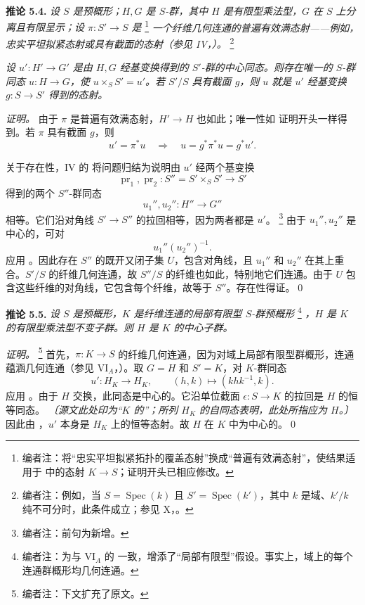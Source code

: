 \medskip
\noindent{}\textbf{推论 5.4.}
\textit{设 \(S\) 是预概形；\(H,G\) 是 \(S\)-群，其中 \(H\) 是有限型乘法型，\(G\) 在 \(S\) 上分离且有限呈示；设 \(\pi:S'\to S\) 是}%
\footnote{编者注：将“忠实平坦拟紧拓扑的覆盖态射”换成“普遍有效满态射”，使结果适用于  中的态射 \(K\to S\)；证明开头已相应修改。}
\textit{一个纤维几何连通的普遍有效满态射——例如，忠实平坦拟紧态射或具有截面的态射（参见 IV，）。}%
\footnote{编者注：例如，当 \(S=\operatorname{Spec}(k)\) 且 \(S'=\operatorname{Spec}(k')\)，其中 \(k\) 是域、\(k'/k\) 纯不可分时，此条件成立；参见 X，。}

\textit{设 \(u':H'\to G'\) 是由 \(H,G\) 经基变换得到的 \(S'\)-群的中心同态。则存在唯一的 \(S\)-群同态 \(u:H\to G\)，使 \(u\times_SS'=u'\)。若 \(S'/S\) 具有截面 \(g\)，则 \(u\) 就是 \(u'\) 经基变换 \(g:S\to S'\) 得到的态射。}

\emph{证明。}
由于 \(\pi\) 是普遍有效满态射，\(H'\to H\) 也如此；唯一性如  证明开头一样得到。若 \(\pi\) 具有截面 \(g\)，则
\[
  u'=\pi^*u
  \quad\Longrightarrow\quad
  u=g^*\pi^*u=g^*u'.
\]

关于存在性，IV 的  将问题归结为说明由 \(u'\) 经两个基变换
\[
  \operatorname{pr}_1,\operatorname{pr}_2:
  S''=S'\times_SS'\longrightarrow S'
\]
得到的两个 \(S''\)-群同态
\[
  u_1'',u_2'':H''\longrightarrow G''
\]
相等。它们沿对角线 \(S'\to S''\) 的拉回相等，因为两者都是 \(u'\)。%
\footnote{编者注：前句为新增。}
由于 \(u_1'',u_2''\) 是中心的，可对
\[
  u_1''(u_2'')^{-1}.
\]
应用 。因此存在 \(S''\) 的既开又闭子集 \(U\)，包含对角线，且 \(u_1''\) 和 \(u_2''\) 在其上重合。\(S'/S\) 的纤维几何连通，故 \(S''/S\) 的纤维也如此，特别地它们连通。由于 \(U\) 包含这些纤维的对角线，它包含每个纤维，故等于 \(S''\)。存在性得证。\qed

\medskip
\noindent{}\textbf{推论 5.5.}
\textit{设 \(S\) 是预概形，\(K\) 是纤维连通的局部有限型 \(S\)-群预概形}%
\footnote{编者注：为与 VI\(_A\) 的  一致，增添了“局部有限型”假设。事实上，域上的每个连通群概形均几何连通。}
\textit{，\(H\) 是 \(K\) 的有限型乘法型不变子群。则 \(H\) 是 \(K\) 的中心子群。}

\emph{证明。}%
\footnote{编者注：下文扩充了原文。}
首先，\(\pi:K\to S\) 的纤维几何连通，因为对域上局部有限型群概形，连通蕴涵几何连通（参见 VI\(_A\)，）。取 \(G=H\) 和 \(S'=K\)，对 \(K\)-群同态
\[
  u':H_K\longrightarrow H_K,
  \qquad
  (h,k)\longmapsto(khk^{-1},k).
\]
应用 。由于 \(H\) 交换，此同态是中心的。它沿单位截面 \(\epsilon:S\to K\) 的拉回是 \(H\) 的恒等同态。
\emph{〔源文此处印为“\(K\) 的”；所列 \(H_K\) 的自同态表明，此处所指应为 \(H\)。〕}
因此由 ，\(u'\) 本身是 \(H_K\) 上的恒等态射。故 \(H\) 在 \(K\) 中为中心的。\qed

